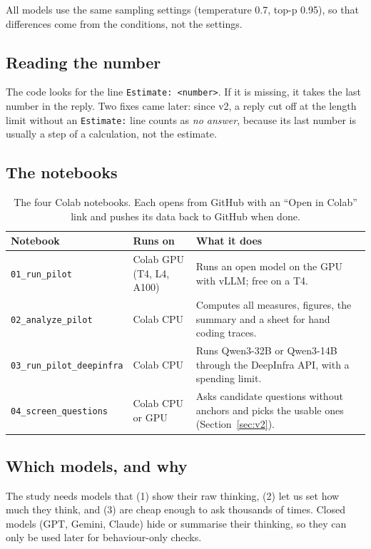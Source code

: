 \documentclass[11pt,a4paper]{article}
\begin{document}
All models use the same sampling settings (temperature 0.7, top-p 0.95), so that differences come from the conditions, not the settings.

\subsection{Reading the number}

The code looks for the line \texttt{Estimate: <number>}. If it is missing, it takes the last number in the reply. Two fixes came later: since v2, a reply cut off at the length limit without an \texttt{Estimate:} line counts as \emph{no answer}, because its last number is usually a step of a calculation, not the estimate.

\subsection{The notebooks}

\begin{table}[ht]
\centering\small
\begin{tabularx}{\textwidth}{@{}P{4.3cm}P{2.6cm}L@{}}
\toprule
\textbf{Notebook} & \textbf{Runs on} & \textbf{What it does} \\
\midrule
\texttt{01\_run\_pilot} & Colab GPU (T4, L4, A100) & Runs an open model on the GPU with vLLM; free on a T4. \\
\texttt{02\_analyze\_pilot} & Colab CPU & Computes all measures, figures, the summary and a sheet for hand coding traces. \\
\texttt{03\_run\_pilot\_deepinfra} & Colab CPU & Runs Qwen3-32B or Qwen3-14B through the DeepInfra API, with a spending limit. \\
\texttt{04\_screen\_questions} & Colab CPU or GPU & Asks candidate questions without anchors and picks the usable ones (Section~\ref{sec:v2}). \\
\bottomrule
\end{tabularx}
\caption{The four Colab notebooks. Each opens from GitHub with an ``Open in Colab'' link and pushes its data back to GitHub when done.}
\end{table}

\subsection{Which models, and why}

The study needs models that (1) show their raw thinking, (2) let us set how much they think, and (3) are cheap enough to ask thousands of times. Closed models (GPT, Gemini, Claude) hide or summarise their thinking, so they can only be used later for behaviour-only checks.
\end{document}
